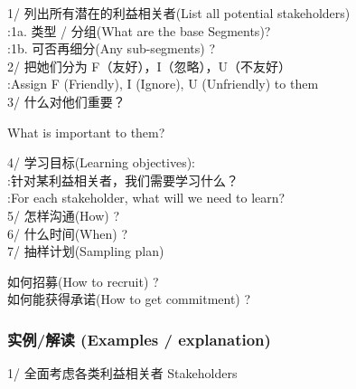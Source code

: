 1/ 列出所有潜在的利益相关者(List all potential stakeholders)\\
:1a. 类型 / 分组(What are the base Segments)?\\
:1b. 可否再细分(Any sub-segments) ?\\
2/ 把她们分为 F（友好），I（忽略），U（不友好）\\
:Assign F (Friendly), I (Ignore), U (Unfriendly) to them\\
3/ 什么对他们重要？

\begin{description}
\tightlist
\item[]
What is important to them?\\
\end{description}

4/ 学习目标(Learning objectives):\\
:针对某利益相关者，我们需要学习什么？\\
:For each stakeholder, what will we need to learn?\\
5/ 怎样沟通(How) ?\\
6/ 什么时间(When) ?\\
7/ 抽样计划(Sampling plan)

\begin{description}
\tightlist
\item[]
如何招募(How to recruit) ?\\

如何能获得承诺(How to get commitment) ?\\
\end{description}

\begin{description}
\item[]
\end{description}

\hypertarget{ux5b9eux4f8bux89e3ux8bfb-examples-explanation}{%
\subsubsection{\texorpdfstring{\textbf{实例/解读 (Examples /
explanation)}}{实例/解读 (Examples / explanation)}}\label{ux5b9eux4f8bux89e3ux8bfb-examples-explanation}}

1/ 全面考虑各类利益相关者 Stakeholders\\

